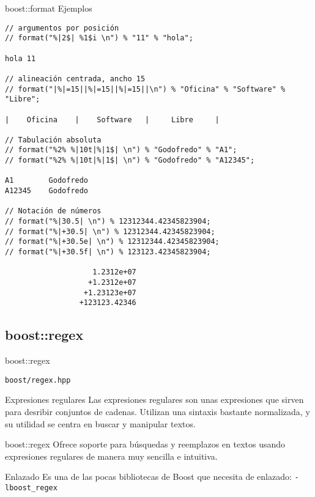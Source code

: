 \documentclass[8pt,xcolor=svgnames]{beamer}
\begin{document}
\begin{frame}[fragile]{boost::format Ejemplos}
  \begin{block}{}
    {\scriptsize
\begin{verbatim}
// argumentos por posición
// format("%|2$| %1$i \n") % "11" % "hola";

hola 11

// alineación centrada, ancho 15
// format("|%|=15||%|=15||%|=15||\n") % "Oficina" % "Software" % "Libre";

|    Oficina    |    Software   |     Libre     |

// Tabulación absoluta
// format("%2% %|10t|%|1$| \n") % "Godofredo" % "A1";    
// format("%2% %|10t|%|1$| \n") % "Godofredo" % "A12345";

A1        Godofredo 
A12345    Godofredo

// Notación de números
// format("%|30.5| \n") % 12312344.42345823904;
// format("%|+30.5| \n") % 12312344.42345823904;  
// format("%|+30.5e| \n") % 12312344.42345823904; 
// format("%|+30.5f| \n") % 123123.42345823904;   

                    1.2312e+07 
                   +1.2312e+07 
                  +1.23123e+07 
                 +123123.42346 
\end{verbatim}
      
    }
  \end{block}
\end{frame}

\subsection{boost::regex}
\begin{frame}{boost::regex}
  \begin{block}{}
    \texttt{boost/regex.hpp}
  \end{block}
  \begin{block}{Expresiones regulares}
    Las expresiones regulares son unas expresiones que sirven para
    desribir conjuntos de cadenas. Utilizan una sintaxis bastante
    normalizada, y su utilidad se centra en buscar y manipular textos.
  \end{block}
  \pause
  \begin{block}{boost::regex}
    Ofrece soporte para búsquedas y reemplazos en textos usando
    expresiones regulares de manera muy sencilla e intuitiva.
  \end{block}
  \pause
  \begin{alertblock}{Enlazado}
    Es una de las pocas bibliotecas de Boost que necesita de
    enlazado: \texttt{-lboost\_regex}
  \end{alertblock}
\end{frame}
\end{document}
